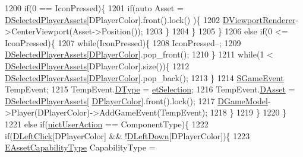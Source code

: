 \begin{DoxyCode}
1200                 \textcolor{keywordflow}{if}(0 == IconPressed)\{
1201                     \textcolor{keywordflow}{if}(\textcolor{keyword}{auto} Asset = \hyperlink{classCApplicationData_a05c1087d5a5c4ddc14fcb37444f1642b}{DSelectedPlayerAssets}[DPlayerColor].front().lock()
      )\{
1202                         \hyperlink{classCApplicationData_a31da050ebca942272344c8b736d72848}{DViewportRenderer}->CenterViewport(Asset->Position());      
1203                     \}
1204                 \}
1205             \}
1206             \textcolor{keywordflow}{else} \textcolor{keywordflow}{if}(0 <= IconPressed)\{
1207                 \textcolor{keywordflow}{while}(IconPressed)\{
1208                     IconPressed--;
1209                     \hyperlink{classCApplicationData_a05c1087d5a5c4ddc14fcb37444f1642b}{DSelectedPlayerAssets}[\hyperlink{classCApplicationData_a53550939b20cba70570f113e4d1c5d02}{DPlayerColor}].pop\_front();
1210                 \}
1211                 \textcolor{keywordflow}{while}(1 < \hyperlink{classCApplicationData_a05c1087d5a5c4ddc14fcb37444f1642b}{DSelectedPlayerAssets}[DPlayerColor].size())\{
1212                     \hyperlink{classCApplicationData_a05c1087d5a5c4ddc14fcb37444f1642b}{DSelectedPlayerAssets}[\hyperlink{classCApplicationData_a53550939b20cba70570f113e4d1c5d02}{DPlayerColor}].pop\_back();
1213                 \}
1214                 \hyperlink{structSGameEvent}{SGameEvent} TempEvent;
1215                 TempEvent.\hyperlink{structSGameEvent_afa10562e243f4ac2b473b655cc58fee7}{DType} = \hyperlink{GameModel_8h_abfcf510bafec7c6429906a6ecaac656da38393c2ecd9404ab15f2f9bb5aab0497}{etSelection};
1216                 TempEvent.\hyperlink{structSGameEvent_a40c85eeac83b96887b7449c9bdc5d624}{DAsset} = \hyperlink{classCApplicationData_a05c1087d5a5c4ddc14fcb37444f1642b}{DSelectedPlayerAssets}[
      \hyperlink{classCApplicationData_a53550939b20cba70570f113e4d1c5d02}{DPlayerColor}].front().lock();
1217                 \hyperlink{classCApplicationData_a32b50c7c1cbac3cfd67c7f775b1d6fee}{DGameModel}->Player(DPlayerColor)->AddGameEvent(TempEvent);
1218             \}
1219         \}
1220     \}
1221     \textcolor{keywordflow}{else} \textcolor{keywordflow}{if}(\hyperlink{classCApplicationData_ad49585591fc53bff1c89bc512170280da9b2752db122b319f942c3b69c2accfab}{uictUserAction} == ComponentType)\{
1222         \textcolor{keywordflow}{if}(\hyperlink{classCApplicationData_a8a86bb4c7cba7b119121401dda4ca68b}{DLeftClick}[DPlayerColor] && !\hyperlink{classCApplicationData_a2b943f18557c3e4c8cd4550e22e028b6}{DLeftDown}[DPlayerColor])\{
1223             \hyperlink{GameDataTypes_8h_a35b98ce26aca678b03c6f9f76e4778ce}{EAssetCapabilityType} CapabilityType = 

\end{DoxyCode}
